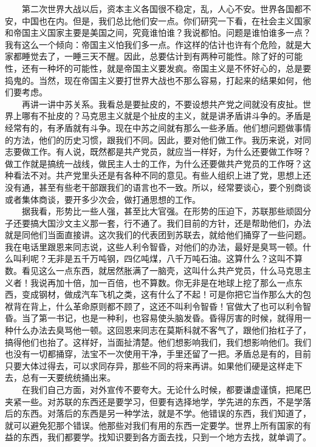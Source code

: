\documentclass[cn,11pt,chinese]{elegantbook}
\begin{document}
　　第二次世界大战以后，资本主义各国很不稳定，乱，人心不安。世界各国都不安，中国也在内。但是，我们总比他们安一点。你们研究一下看，在社会主义国家和帝国主义国家主要是美国之间，究竟谁怕谁？我说都怕。问题是谁怕谁多一点？我有这么一个倾向：帝国主义怕我们多一点。作这样的估计也许有个危险，就是大家都睡觉去了，一睡三天不醒。因此，总要估计到有两种可能性。除了好的可能性，还有一种坏的可能性，就是帝国主义要发疯。帝国主义是不怀好心的，总是要捣鬼的。当然，现在帝国主义要打世界大战也不那么容易，打起来的结果如何，他们要考虑。\\
　　再讲一讲中苏关系。我看总是要扯皮的，不要设想共产党之间就没有皮扯。世界上哪有不扯皮的？马克思主义就是个扯皮的主义，就是讲矛盾讲斗争的。矛盾是经常有的，有矛盾就有斗争。现在中苏之间就有那么一些矛盾。他们想问题做事情的方法，他们的历史习惯，跟我们不同。因此，要对他们做工作。我历来说，对同志要做工作。有人说，既然都是共产党员，就应当一样好，为什么还要做工作呀？做工作就是搞统一战线，做民主人士的工作，为什么还要做共产党员的工作呀？这种看法不对。共产党里头还是有各种不同的意见。有些人组织上进了党，思想上还没有通，甚至有些老干部跟我们的语言也不一致。所以，经常要谈心，要个别商谈或者集体商谈，要开多少次会，做打通思想的工作。\\
　　据我看，形势比一些人强，甚至比大官强。在形势的压迫下，苏联那些顽固分子还要搞大国沙文主义那一套，行不通了。我们目前的方针，还是帮助他们，办法就是同他们当面直接讲。这次我们的代表团到苏联去，就给他们捅穿了一些问题。我在电话里跟恩来同志说，这些人利令智昏，对他们的办法，最好是臭骂一顿。什么叫利呢？无非是五千万吨钢，四亿吨煤，八千万吨石油。这算什么？这叫不算数。看见这么一点东西，就居然胀满了一脑壳，这叫什么共产党员，什么马克思主义者！我说再加十倍，加一百倍，也不算数。你无非是在地球上挖了那么一点东西，变成钢材，做成汽车飞机之类，这有什么了不起！可是你把它当作那么大的包袱背在背上，什么革命原则都不顾了，这还不叫利令智昏！官做大了也可以利令智昏。当了第一书记，也是一种利，也容易使头脑发昏。昏得厉害的时候，就得用一种什么办法去臭骂他一顿。这回恩来同志在莫斯科就不客气了，跟他们抬杠子了，搞得他们也抬了。这样好，当面扯清楚。他们想影响我们，我们想影响他们。我们也没有一切都捅穿，法宝不一次使用干净，手里还留了一把。矛盾总是有的，目前只要大体过得去，可以求同存异，那些不同的将来再讲。如果他们硬是这样走下去，总有一天要统统捅出来。\\
　　在我们自己方面，对外宣传不要夸大。无论什么时候，都要谦虚谨慎，把尾巴夹紧一些。对苏联的东西还是要学习，但要有选择地学，学先进的东西，不是学落后的东西。对落后的东西是另一种学法，就是不学。他错误的东西，我们知道了，就可以避免犯那个错误。他那些对我们有用的东西一定要学。世界上所有国家的有益的东西，我们都要学。找知识要到各方面去找，只到一个地方去找，就单调了。\\
\end{document}
